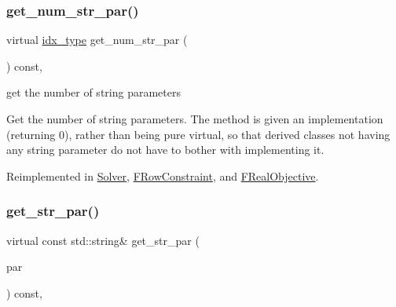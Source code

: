 \subsubsection{\texorpdfstring{get\+\_\+num\+\_\+str\+\_\+par()}{get\_num\_str\_par()}}
{\footnotesize\ttfamily virtual \mbox{\hyperlink{class_s_m_spp__di__unipi__it_1_1_thin_compute_interface_aa3d710629ad8c434286726ad810c3b47}{idx\+\_\+type}} get\+\_\+num\+\_\+str\+\_\+par (\begin{DoxyParamCaption}\item[{void}]{ }\end{DoxyParamCaption}) const\hspace{0.3cm}{\ttfamily [inline]}, {\ttfamily [virtual]}}



get the number of string parameters 

Get the number of string parameters. The method is given an implementation (returning 0), rather than being pure virtual, so that derived classes not having any string parameter do not have to bother with implementing it. 

Reimplemented in \mbox{\hyperlink{class_s_m_spp__di__unipi__it_1_1_solver_a91f0341f09d59b3023fc95122a625125}{Solver}}, \mbox{\hyperlink{class_s_m_spp__di__unipi__it_1_1_f_row_constraint_a91f0341f09d59b3023fc95122a625125}{F\+Row\+Constraint}}, and \mbox{\hyperlink{class_s_m_spp__di__unipi__it_1_1_f_real_objective_a91f0341f09d59b3023fc95122a625125}{F\+Real\+Objective}}.

\mbox{\label{class_s_m_spp__di__unipi__it_1_1_thin_compute_interface_abdd41940763ebff749e5f16e6ea310c6}} 
\subsubsection{\texorpdfstring{get\+\_\+str\+\_\+par()}{get\_str\_par()}}
{\footnotesize\ttfamily virtual const std\+::string\& get\+\_\+str\+\_\+par (\begin{DoxyParamCaption}\item[{const \mbox{\hyperlink{class_s_m_spp__di__unipi__it_1_1_thin_compute_interface_aa3d710629ad8c434286726ad810c3b47}{idx\+\_\+type}}}]{par }\end{DoxyParamCaption}) const\hspace{0.3cm}{\ttfamily [inline]}, {\ttfamily [virtual]}}




